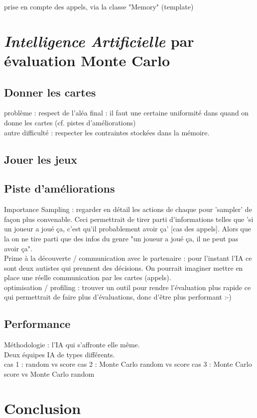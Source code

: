 \documentclass[a4paper,11pt]{article}
\begin{document}
prise en compte des appels, via la classe "Memory" (template)

\clearpage
\section{\textit{Intelligence Artificielle} par évaluation Monte Carlo}
\subsection{Donner les cartes}
problème : respect de l'aléa final : il faut une certaine uniformité dans quand on donne les cartes (cf. pistes d'améliorations) \\

autre difficulté : respecter les contraintes stockées dans la mémoire.
\subsection{Jouer les jeux}
\subsection{Piste d'améliorations}
Importance Sampling : regarder en détail les actions de chaque pour 'sampler' de façon plus convenable. Ceci permettrait de tirer parti d'informations telles que 'si un joueur a joué ça, c'est qu'il probablement avoir ça' [cas des appels]. Alors que la on ne tire parti que des infos du genre "un joueur a joué ça, il ne peut pas avoir ça".  \\

Prime à la découverte / communication avec le partenaire : pour l'instant l'IA ce sont deux autistes qui prennent des décisions. On pourrait imaginer mettre en place une réelle communication par les cartes (appels). \\

optimisation / profiling : trouver un outil pour rendre l'évaluation plus rapide ce qui permettrait de faire plus d'évaluations, donc d'être plus performant :-)
\subsection{Performance}
Méthodologie : l'IA qui s'affronte elle même. \\
Deux équipes IA de types différents. \\
cas 1 : random vs score
cas 2 : Monte Carlo random vs score
cas 3 : Monte Carlo score vs Monte Carlo random

\clearpage
\section*{Conclusion}
\end{document}
